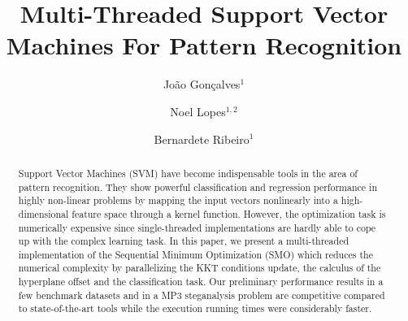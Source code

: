 \documentclass{llncs}
\begin{document}
%
\title{Multi-Threaded Support Vector Machines For Pattern Recognition}
%





\author{Jo\~ao Gon\c{c}alves$^{1}$ \and Noel Lopes$^{1,2}$ \and Bernardete Ribeiro$^{1}$}
%
%
\maketitle              %



\begin{abstract}
Support Vector Machines (SVM) have become indispensable tools in the area of pattern recognition. They show powerful classification and regression performance in highly non-linear problems by mapping the input vectors
nonlinearly into a high-dimensional feature space through a kernel function. However, the optimization task is numerically expensive since single-threaded implementations are hardly able to
cope up with the complex learning task. In  this paper, we present a multi-threaded implementation of the Sequential Minimum Optimization (SMO) which reduces the numerical complexity by parallelizing the KKT conditions update, the calculus of the hyperplane offset and the classification task.
Our preliminary performance results in a few benchmark datasets and in a MP3 steganalysis problem are competitive compared to state-of-the-art tools while the execution running times were considerably faster. 
\end{abstract}
%

\end{document}
